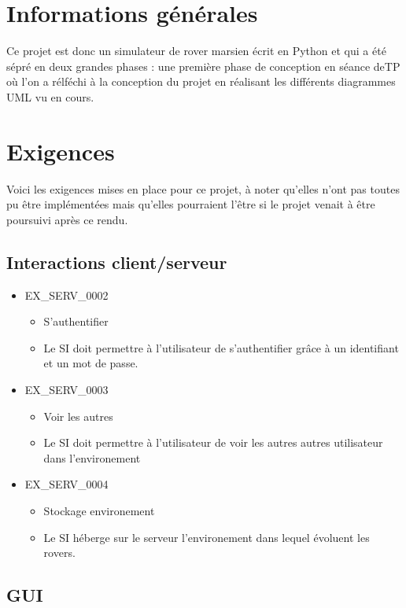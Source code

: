 \documentclass[12pt,a4paper]{scrartcl}
\begin{document}
\section{Informations générales}
Ce projet est donc un simulateur de rover marsien écrit en Python et qui a été sépré en deux grandes phases : 
une première phase de conception en séance deTP où l'on a rélféchi à la conception du projet en réalisant
les différents diagrammes UML vu en cours.

\section{Exigences}
Voici les exigences mises en place pour ce projet, à noter qu'elles n'ont pas toutes pu être implémentées
mais qu'elles pourraient l'être si le projet venait à être poursuivi après ce rendu.

\subsection{Interactions client/serveur}

\begin{itemize}

\item EX\_SERV\_0002
\begin{itemize}
\item S'authentifier
\item Le SI doit permettre à l'utilisateur de s'authentifier grâce à un
		identifiant et un mot de passe.
\end{itemize}


\item EX\_SERV\_0003
\begin{itemize}
\item Voir les autres
\item Le SI doit permettre à l'utilisateur de voir les autres autres 
	utilisateur dans l'environement
\end{itemize}

\item EX\_SERV\_0004
\begin{itemize}
\item Stockage environement
\item Le SI héberge sur le serveur l'environement dans lequel évoluent les 
	rovers.
\end{itemize}


\end{itemize}

\subsection{GUI}
\end{document}
